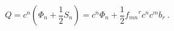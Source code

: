 \begin{equation}
Q = c^{n}(\Phi_n+\frac{1}{2}S_n)=c^n\Phi_n +\frac{1}{2}{f_{mn}}^r c^n c^m b_r~.       \label{eq:botuzuc}
\end{equation}

